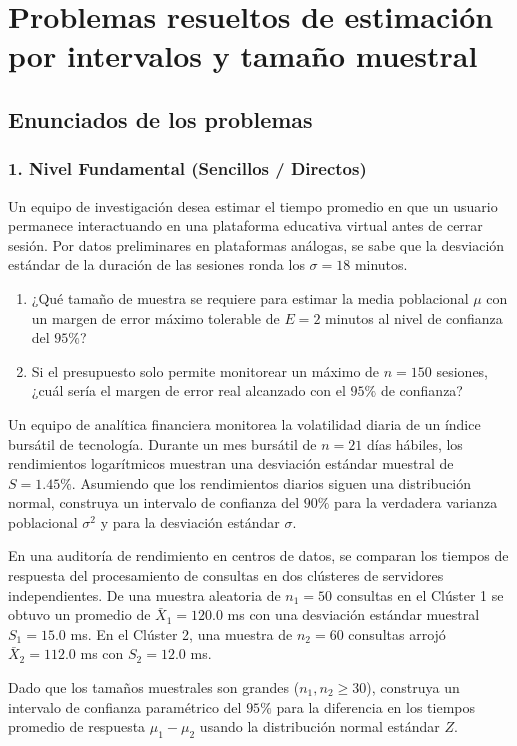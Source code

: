 \section{Problemas resueltos de estimación por intervalos y tamaño muestral}

\subsection{Enunciados de los problemas}

\subsubsection*{1. Nivel Fundamental (Sencillos / Directos)}

\begin{problema}
	\label{prob:n_media}
	Un equipo de investigación desea estimar el tiempo promedio en que un usuario permanece interactuando en una plataforma educativa virtual antes de cerrar sesión. Por datos preliminares en plataformas análogas, se sabe que la desviación estándar de la duración de las sesiones ronda los $\sigma = 18$ minutos.
	\begin{enumerate}
		\item ¿Qué tamaño de muestra se requiere para estimar la media poblacional $\mu$ con un margen de error máximo tolerable de $E = 2$ minutos al nivel de confianza del $95\%$?
		\item Si el presupuesto solo permite monitorear un máximo de $n = 150$ sesiones, ¿cuál sería el margen de error real alcanzado con el $95\%$ de confianza?
	\end{enumerate}
\end{problema}

\begin{problema}
	\label{prob:ic_varianza}
	Un equipo de analítica financiera monitorea la volatilidad diaria de un índice bursátil de tecnología. Durante un mes bursátil de $n = 21$ días hábiles, los rendimientos logarítmicos muestran una desviación estándar muestral de $S = 1.45\%$. Asumiendo que los rendimientos diarios siguen una distribución normal, construya un intervalo de confianza del $90\%$ para la verdadera varianza poblacional $\sigma^2$ y para la desviación estándar $\sigma$.
\end{problema}

\begin{problema}
	\label{prob:dif_medias_z_avanzado}
	En una auditoría de rendimiento en centros de datos, se comparan los tiempos de respuesta del procesamiento de consultas en dos clústeres de servidores independientes. De una muestra aleatoria de $n_1 = 50$ consultas en el Clúster 1 se obtuvo un promedio de $\bar{X}_1 = 120.0$ ms con una desviación estándar muestral $S_1 = 15.0$ ms. En el Clúster 2, una muestra de $n_2 = 60$ consultas arrojó $\bar{X}_2 = 112.0$ ms con $S_2 = 12.0$ ms.
	
	Dado que los tamaños muestrales son grandes ($n_1, n_2 \ge 30$), construya un intervalo de confianza paramétrico del $95\%$ para la diferencia en los tiempos promedio de respuesta $\mu_1 - \mu_2$ usando la distribución normal estándar $Z$.
\end{problema}


